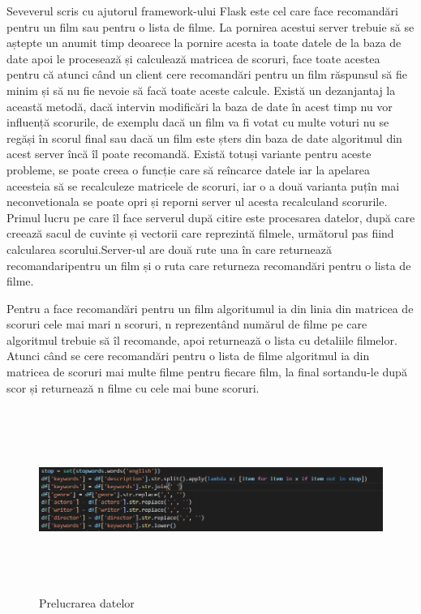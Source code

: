 \par Seveverul scris cu ajutorul framework-ului Flask este cel care face recomandări pentru un film sau pentru o lista de filme. La pornirea acestui server trebuie să se aștepte un anumit timp deoarece la pornire acesta ia toate datele de la baza de date apoi le procesează și calculează matricea de scoruri, face toate acestea pentru că atunci când un client cere recomandări pentru un film răspunsul să fie minim și să nu fie nevoie să facă toate aceste calcule. Există un dezanjantaj la această metodă, dacă intervin modificări la baza de date în acest timp nu vor influență scorurile, de exemplu dacă un film va fi votat cu multe voturi nu se regăși în scorul final sau dacă un film este șters din baza de date algoritmul din acest server încă îl poate recomandă. Există totuși variante pentru aceste probleme, se poate creea o funcție care să reîncarce datele iar la apelarea aceesteia să se recalculeze matricele de scoruri, iar o a două varianta puțîn mai neconvetionala se poate opri și reporni server ul acesta recalculand scorurile. Primul lucru pe care îl face serverul după citire este procesarea datelor, după care creează sacul de cuvinte și vectorii care reprezintă filmele, următorul pas fiind calcularea scorului.Server-ul are două rute una în care returnează recomandaripentru un film și o ruta care returneza recomandări pentru o lista de filme.
\par Pentru a face recomandări pentru un film algoritumul ia din linia din matricea de scoruri cele mai mari n scoruri, n reprezentând numărul de filme pe care algoritmul trebuie să îl recomande, apoi returnează o lista cu detaliile filmelor. Atunci când se cere recomandări pentru o lista de filme algoritmul ia din matricea de scoruri mai multe filme pentru fiecare film, la final sortandu-le după scor și returnează n filme cu cele mai bune scoruri.
\begin{figure}[!h]
			\centerline{\includegraphics[width=15cm, height=6cm]{figures/prelucrare.png}}
			\caption{Prelucrarea datelor}
			\label{fig}
		\end{figure}

